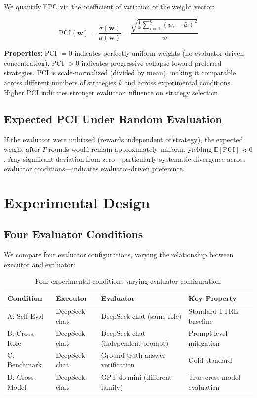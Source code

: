 \documentclass[11pt,a4paper]{article}
\begin{document}
We quantify EPC via the coefficient of variation of the weight vector:

\begin{equation}
\text{PCI}(\mathbf{w}) = \frac{\sigma(\mathbf{w})}{\mu(\mathbf{w})} = \frac{\sqrt{\frac{1}{k}\sum_{i=1}^k (w_i - \bar{w})^2}}{\bar{w}}
\end{equation}

\textbf{Properties:} PCI $= 0$ indicates perfectly uniform weights (no evaluator-driven concentration). PCI $> 0$ indicates progressive collapse toward preferred strategies. PCI is scale-normalized (divided by mean), making it comparable across different numbers of strategies $k$ and across experimental conditions. Higher PCI indicates stronger evaluator influence on strategy selection.

\subsection{Expected PCI Under Random Evaluation}

If the evaluator were unbiased (rewards independent of strategy), the expected weight after $T$ rounds would remain approximately uniform, yielding $\mathbb{E}[\text{PCI}] \approx 0$. Any significant deviation from zero---particularly systematic divergence across evaluator conditions---indicates evaluator-driven preference.

\section{Experimental Design}

\subsection{Four Evaluator Conditions}

We compare four evaluator configurations, varying the relationship between executor and evaluator:

\begin{table}[H]
\centering
\caption{Four experimental conditions varying evaluator configuration.}
\begin{tabular}{llll}
\toprule
\textbf{Condition} & \textbf{Executor} & \textbf{Evaluator} & \textbf{Key Property} \\
\midrule
A: Self-Eval & DeepSeek-chat & DeepSeek-chat (same role) & Standard TTRL baseline \\
B: Cross-Role & DeepSeek-chat & DeepSeek-chat (independent prompt) & Prompt-level mitigation \\
C: Benchmark & DeepSeek-chat & Ground-truth answer verification & Gold standard \\
D: Cross-Model & DeepSeek-chat & GPT-4o-mini (different family) & True cross-model evaluation \\
\bottomrule
\end{tabular}
\end{table}
\end{document}
